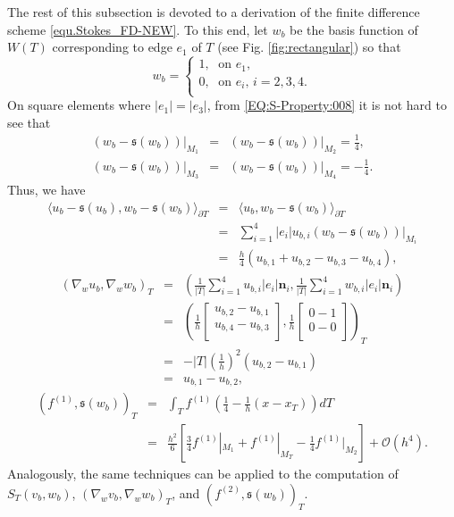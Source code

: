 \documentclass[final,leqno]{siamltex704}
\def\S{{\mathfrak s}}
\def\O{{\mathcal O}}
\begin{document}
The rest of this subsection is devoted to a derivation of the finite difference scheme  \eqref{equ.Stokes_FD-NEW}. To this end, let $w_b$ be the basis function of $W(T)$ corresponding to edge $e_1$ of $T$ (see Fig. \ref{fig:rectangular}) so that
\begin{equation*}
w_b=\left\{
\begin{array}{lllll}
1,\; \text{ on } e_1,\\
0,\; \text{ on } e_i, \, i=2,3,4.\\
\end{array}
\right.
\end{equation*}
On square elements where $|e_1|=|e_3|$, from \eqref{EQ:S-Property:008} it is not hard to see that
\begin{eqnarray*}
(w_b-\S(w_b))|_{M_1} &=&(w_b-\S(w_b))|_{M_2} =\displaystyle\frac{1}{4},\\
(w_b-\S(w_b))|_{M_3} &=&(w_b-\S(w_b))|_{M_4} =-\displaystyle\frac{1}{4}.
\end{eqnarray*}
Thus, we have
\begin{eqnarray}
\langle u_b- \S(u_b), w_b-\S(w_b)\rangle_{\partial T}&=&\langle u_b, w_b-\S(w_b)\rangle_{\partial T}\label{equ.SM.square.1}\\
&=&\sum_{i=1}^4 |e_i|u_{b,i}(w_b-\S(w_b))|_{M_i}\nonumber\\
&=&\displaystyle\frac{h}{4}(u_{b,1}+u_{b,2} -u_{b,3}-u_{b,4}),\nonumber
\end{eqnarray}
\begin{eqnarray}
(\nabla_w u_b, \nabla_w w_b)_{T} &= &\left(\displaystyle\frac{1}{|T|}\sum_{i=1}^4 u_{b,i}|e_i|\bm{n}_i,\displaystyle\frac{1}{|T|}\sum_{i=1}^4 w_{b,i}|e_i|\bm{n}_i\right)\label{equ.SM.square.2}\\
&=&\left(
\displaystyle\frac{1}{h}\left[
\begin{array}{lllll}
u_{b,2} - u_{b,1} \\
u_{b,4} - u_{b,3} \\
\end{array}
\right],
\displaystyle\frac{1}{h}\left[
\begin{array}{lllll}
0 - 1\\
0 - 0\\
\end{array}
\right]
\right)_T \nonumber\\
&=&-|T|\left(\frac{1}{h}\right)^2(u_{b,2}-u_{b,1})\nonumber\\&=&u_{b,1}-u_{b,2},\nonumber
\end{eqnarray}
\begin{eqnarray}
(f^{(1)}, \S(w_b))_T  &=&\displaystyle\int_T f^{(1)} \left(\frac{1}{4}-\frac{1}{h}(x-x_T)\right)dT~~~~~~~~~~~~~~~~~~ \label{equ.SM.square.3}\\
                 &=&\displaystyle \frac{h^2}{6} \left[\frac{3}{4}f^{(1)}|_{M_1} +f^{(1)}|_{M_T} - \frac{1}{4}f^{(1)}|_{M_2} \right] + \O(h^4).\nonumber
\end{eqnarray}
Analogously, the same techniques can be applied to the computation of $S_T(v_b,w_b)$, $(\nabla_w v_b,\nabla_w w_b )_T$, and $(f^{(2)}, \S(w_b))_T$.
\end{document}

